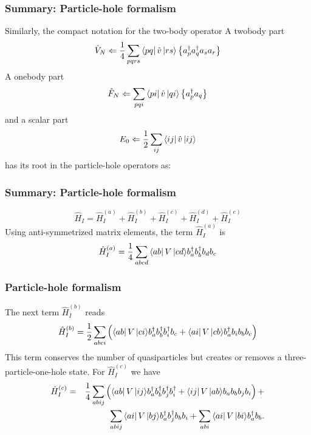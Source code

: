 \frame
{
  \frametitle{Summary: Particle-hole formalism}
\begin{small}
{\scriptsize
Similarly, the compact notation for the  two-body operator
    A twobody part
    \begin{equation*}
            \hat{V}_N \Leftarrow \frac{1}{4} \sum_{pqrs} \bra{pq}\hat{v}\,|{rs}\rangle 
                \left\{a^\dagger_p a^\dagger_q a_s  a_r\right\}
    \end{equation*}
    A onebody part
    \begin{equation*}
            \hat{F}_N \Leftarrow \sum_{pqi} \bra{pi}\hat{v}\,|{qi}\rangle \left\{a^\dagger_p a_q\right\}
    \end{equation*}
    and a scalar part
    \begin{equation*}
                E_0 \Leftarrow \frac{1}{2} \sum_{ij} \bra{ij}\hat{v}\,|{ij}\rangle
    \end{equation*}
has its root in the particle-hole operators as:
}
\end{small}
}



\frame
{
  \frametitle{Summary: Particle-hole formalism}
\begin{small}
{\scriptsize
\[
	\hat{H}_I = \hat{H}_I^{(a)} + \hat{H}_I^{(b)} + \hat{H}_I^{(c)} + \hat{H}_I^{(d)} + \hat{H}_I^{(e)}
\]
Using anti-symmetrized  matrix elements, 
the term  $\hat{H}_I^{(a)}$ is  
\[
	\hat{H}_I^{(a)} = \frac{1}{4}
	\sum_{abcd} \bra{ab}V\,|{cd}\rangle 
		b_a^\dagger b_b^\dagger b_d b_c 
\]
}
\end{small}
}


\frame
{
  \frametitle{Particle-hole formalism}
\begin{small}
{\scriptsize
The next term $\hat{H}_I^{(b)}$  reads
\[
	 \hat{H}_I^{(b)} = \frac{1}{2} \sum_{abci}\left(\bra{ab}V\,|{ci}\rangle b_a^\dagger b_b^\dagger b_i^\dagger b_c +\bra{ai}V\,|{cb}\rangle
		b_a^\dagger b_i b_b b_c\right)
\]
This term conserves the number of quasiparticles but creates or removes a 
three-particle-one-hole  state. 
For $\hat{H}_I^{(c)}$  we have
\begin{eqnarray}
	\hat{H}_I^{(c)}& =& \frac{1}{4}
		\sum_{abij}\left(\bra{ab}V\,|{ij}\rangle b_a^\dagger b_b^\dagger b_j^\dagger b_i^\dagger +
		\bra{ij}V\,|{ab}\rangle b_a  b_b b_j b_i \right)+  \nonumber \\
	&&	\sum_{abij}\bra{ai}V\,|{bj}\rangle b_a^\dagger b_j^\dagger b_b b_i + 
		\sum_{abi}\bra{ai}V\,|{bi}\rangle b_a^\dagger b_b. \nonumber
\end{eqnarray}
}
\end{small}
}


